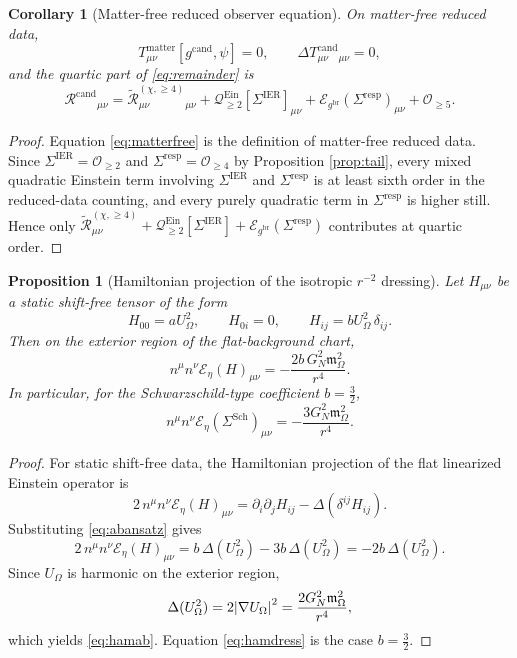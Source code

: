 \documentclass[11pt]{article}
\newcommand{\ObserverMetric}{g^{\mathrm{br}}}
\newcommand{\CandidateMetric}{g^{\mathrm{cand}}}
\newcommand{\BaseShift}{\Sigma^{\mathrm{IER}}}
\newcommand{\ResponseShift}{\Sigma^{\mathrm{resp}}}
\newcommand{\ResponseShiftSch}{\Sigma^{\mathrm{Sch}}}
\newcommand{\HamChargeOmega}{\mathfrak m_\Omega}
\newcommand{\ReLongFour}{\widetilde{\mathcal R}_{\mu\nu}^{(\chi,\ge 4)}}
\newcommand{\DeltaTCand}{\Delta T_{\mu\nu}^{\mathrm{cand}}}
\newcommand{\ObserverRemCand}{\mathcal R^{\mathrm{cand}}}
\newcommand{\EinLin}{\mathcal E_{\ObserverMetric}}
\newcommand{\EinLinFlat}{\mathcal E_{\eta}}
\newcommand{\EinQuad}{\mathcal Q_{\ge 2}^{\mathrm{Ein}}}
\newtheorem{proposition}{Proposition}
\newtheorem{corollary}{Corollary}
\begin{document}
\begin{corollary}[Matter-free reduced observer equation]
\label{cor:matterfree}
On matter-free reduced data,
\begin{equation}
T_{\mu\nu}^{\mathrm{matter}}[\CandidateMetric,\psi]=0,
\qquad
\DeltaTCand{}_{\mu\nu}=0,
\label{eq:matterfree}
\end{equation}
and the quartic part of \eqref{eq:remainder} is
\begin{equation}
\ObserverRemCand{}_{\mu\nu}
=
\ReLongFour{}_{\mu\nu}
+\EinQuad[\BaseShift]_{\mu\nu}
+\EinLin(\ResponseShift)_{\mu\nu}
+\mathcal O_{\ge 5}.
\label{eq:quarticremainder}
\end{equation}
\end{corollary}

\begin{proof}
Equation \eqref{eq:matterfree} is the definition of matter-free reduced data. Since \(\BaseShift=\mathcal O_{\ge 2}\) and \(\ResponseShift=\mathcal O_{\ge 4}\) by Proposition \ref{prop:tail}, every mixed quadratic Einstein term involving \(\BaseShift\) and \(\ResponseShift\) is at least sixth order in the reduced-data counting, and every purely quadratic term in \(\ResponseShift\) is higher still. Hence only \(\ReLongFour+\EinQuad[\BaseShift]+\EinLin(\ResponseShift)\) contributes at quartic order.
\end{proof}

\begin{proposition}[Hamiltonian projection of the isotropic \(r^{-2}\) dressing]
\label{prop:ham}
Let \(H_{\mu\nu}\) be a static shift-free tensor of the form
\begin{equation}
H_{00}=aU_\Omega^2,
\qquad
H_{0i}=0,
\qquad
H_{ij}=bU_\Omega^2\,\delta_{ij}.
\label{eq:abansatz}
\end{equation}
Then on the exterior region of the flat-background chart,
\begin{equation}
n^\mu n^\nu \EinLinFlat(H)_{\mu\nu}
=
-\frac{2b\,G_N^2\HamChargeOmega^2}{r^4}.
\label{eq:hamab}
\end{equation}
In particular, for the Schwarzschild-type coefficient \(b=\frac32\),
\begin{equation}
n^\mu n^\nu \EinLinFlat(\ResponseShiftSch)_{\mu\nu}
=
-\frac{3G_N^2\HamChargeOmega^2}{r^4}.
\label{eq:hamdress}
\end{equation}
\end{proposition}

\begin{proof}
For static shift-free data, the Hamiltonian projection of the flat linearized Einstein operator is
\[
2\,n^\mu n^\nu \EinLinFlat(H)_{\mu\nu}
=
\partial_i\partial_j H_{ij}
-\Delta(\delta^{ij}H_{ij}).
\]
Substituting \eqref{eq:abansatz} gives
\[
2\,n^\mu n^\nu \EinLinFlat(H)_{\mu\nu}
=
b\,\Delta(U_\Omega^2)-3b\,\Delta(U_\Omega^2)
=
-2b\,\Delta(U_\Omega^2).
\]
Since \(U_\Omega\) is harmonic on the exterior region,
\[
\Delta(U_\Omega^2)=2\abs{\nabla U_\Omega}^2
=
\frac{2G_N^2\HamChargeOmega^2}{r^4},
\]
which yields \eqref{eq:hamab}. Equation \eqref{eq:hamdress} is the case \(b=\frac32\).
\end{proof}
\end{document}
